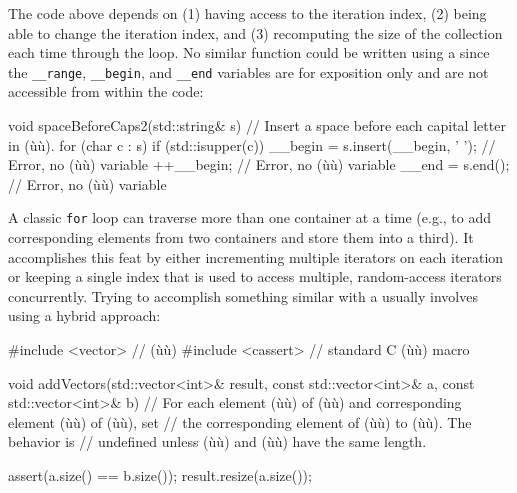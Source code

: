 {{{\noindent The code above depends on (1) having access to the iteration index, (2)
being able to change the iteration index, and (3) recomputing the size
of the collection each time through the loop. No similar function could
be written using a  since the
\lstinline!__range!, \lstinline!__begin!, and \lstinline!__end! variables
are for exposition only and are not accessible from within the code:

\begin{emcppslisting}[emcppsbatch=e7]
void spaceBeforeCaps2(std::string& s)
{
    // Insert a space before each capital letter in (ù{}ù).
    for (char c : s)
    {
        if (std::isupper(c))
        {
            __begin = s.insert(__begin, ' ');  // Error, no (ù{}ù) variable
            ++__begin;                         // Error, no (ù{}ù) variable
            __end = s.end();                   // Error, no (ù{}ù) variable
        }
    }
}
\end{emcppslisting}
    

\noindent A classic \lstinline!for! loop can traverse more than one container at a
time (e.g., to add corresponding elements from two containers and store
them into a third). It accomplishes this feat by either incrementing
multiple iterators on each iteration or keeping a single index that is
used to access multiple, random-access iterators concurrently. Trying to
accomplish something similar with a  usually involves using a hybrid approach:

\begin{emcppslisting}
#include <vector>   // (ù{}ù)
#include <cassert>  // standard C (ù{}ù) macro

void addVectors(std::vector<int>&       result,
                const std::vector<int>& a,
                const std::vector<int>& b)
    // For each element (ù{}ù) of (ù{}ù) and corresponding element (ù{}ù) of (ù{}ù), set
    // the corresponding element of (ù{}ù) to (ù{}ù).  The behavior is
    // undefined unless (ù{}ù) and (ù{}ù) have the same length.
{
    assert(a.size() == b.size());
    result.resize(a.size());

}
\end{emcppslisting}}}}
